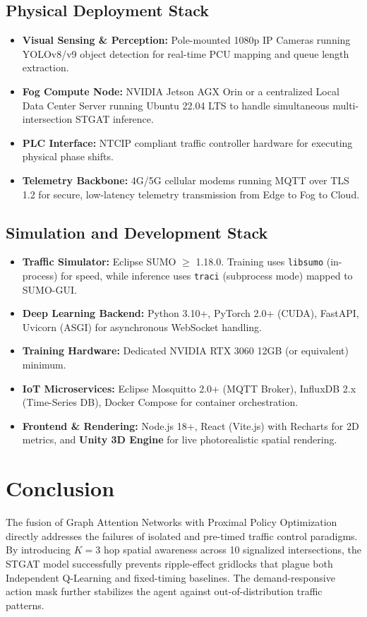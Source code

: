 \documentclass[12pt, onecolumn]{IEEEtran}
\begin{document}
\subsection{Physical Deployment Stack}
\begin{itemize}
    \item \textbf{Visual Sensing \& Perception:} Pole-mounted 1080p IP Cameras running YOLOv8/v9 object detection for real-time PCU mapping and queue length extraction.
    \item \textbf{Fog Compute Node:} NVIDIA Jetson AGX Orin or a centralized Local Data Center Server running Ubuntu 22.04 LTS to handle simultaneous multi-intersection STGAT inference.
    \item \textbf{PLC Interface:} NTCIP compliant traffic controller hardware for executing physical phase shifts.
    \item \textbf{Telemetry Backbone:} 4G/5G cellular modems running MQTT over TLS 1.2 for secure, low-latency telemetry transmission from Edge to Fog to Cloud.
\end{itemize}

\subsection{Simulation and Development Stack}
\begin{itemize}
    \item \textbf{Traffic Simulator:} Eclipse SUMO $\geq$ 1.18.0. Training uses \texttt{libsumo} (in-process) for speed, while inference uses \texttt{traci} (subprocess mode) mapped to SUMO-GUI.
    \item \textbf{Deep Learning Backend:} Python 3.10+, PyTorch 2.0+ (CUDA), FastAPI, Uvicorn (ASGI) for asynchronous WebSocket handling.
    \item \textbf{Training Hardware:} Dedicated NVIDIA RTX 3060 12GB (or equivalent) minimum.
    \item \textbf{IoT Microservices:} Eclipse Mosquitto 2.0+ (MQTT Broker), InfluxDB 2.x (Time-Series DB), Docker Compose for container orchestration.
    \item \textbf{Frontend \& Rendering:} Node.js 18+, React (Vite.js) with Recharts for 2D metrics, and \textbf{Unity 3D Engine} for live photorealistic spatial rendering.
\end{itemize}
\section{Conclusion}
The fusion of Graph Attention Networks with Proximal Policy Optimization directly addresses the failures of isolated and pre-timed traffic control paradigms. By introducing $K{=}3$ hop spatial awareness across 10 signalized intersections, the STGAT model successfully prevents ripple-effect gridlocks that plague both Independent Q-Learning and fixed-timing baselines. The demand-responsive action mask further stabilizes the agent against out-of-distribution traffic patterns.
\end{document}
